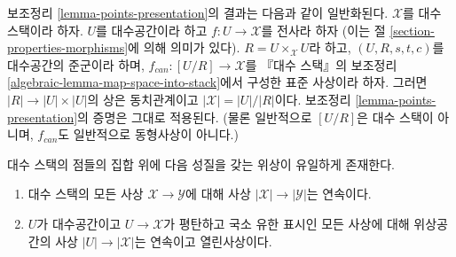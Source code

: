 \begin{remark}
\label{remark-more-general-presentation}
보조정리 \ref{lemma-points-presentation}의 결과는 다음과 같이 일반화된다.
$\mathcal{X}$를 대수 스택이라 하자.
$U$를 대수공간이라 하고 $f : U \to \mathcal{X}$를 전사라 하자
(이는 절 \ref{section-properties-morphisms}에 의해 의미가 있다).
$R = U \times_\mathcal{X} U$라 하고, $(U, R, s, t, c)$를 대수공간의
준군이라 하며, $f_{can} : [U/R] \to \mathcal{X}$를 『대수 스택』의
보조정리 \ref{algebraic-lemma-map-space-into-stack}에서 구성한
표준 사상이라 하자. 그러면 $|R| \to |U| \times |U|$의 상은
동치관계이고 $|\mathcal{X}| = |U|/|R|$이다.
보조정리 \ref{lemma-points-presentation}의 증명은 그대로 적용된다.
(물론 일반적으로 $[U/R]$은 대수 스택이 아니며,
$f_{can}$도 일반적으로 동형사상이 아니다.)
\end{remark}

\begin{lemma}
\label{lemma-topology-points}
대수 스택의 점들의 집합 위에 다음 성질을 갖는 위상이 유일하게 존재한다.
\begin{enumerate}
\item 대수 스택의 모든 사상 $\mathcal{X} \to \mathcal{Y}$에 대해
사상 $|\mathcal{X}| \to |\mathcal{Y}|$는 연속이다.
\item $U$가 대수공간이고 $U \to \mathcal{X}$가 평탄하고 국소 유한
표시인 모든 사상에 대해 위상공간의 사상
$|U| \to |\mathcal{X}|$는 연속이고 열린사상이다.
\end{enumerate}
\end{lemma}

